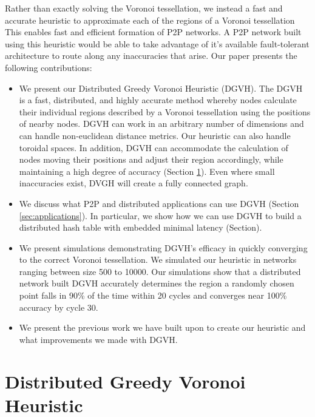 \documentclass[11pt, conference, letterpaper]{IEEEtran}
\begin{document}
Rather than exactly solving the Voronoi tessellation, we instead a fast and accurate heuristic to approximate each of the regions of a Voronoi tessellation
This enables fast and efficient formation of P2P networks.
A P2P network built using this heuristic would be able to take advantage of it's available fault-tolerant architecture to route along any inaccuracies that arise.
Our paper presents the following contributions:
\begin{itemize}
	\item We present our Distributed Greedy Voronoi Heuristic (DGVH). 
	The DGVH is a fast, distributed, and highly accurate method whereby nodes calculate their individual regions described by a Voronoi tessellation using the positions of nearby nodes.
	DGVH can work in an arbitrary number of dimensions and can handle non-euclidean distance metrics.
    Our heuristic can also handle toroidal spaces.
	In addition, DGVH can accommodate the calculation of nodes moving their positions and adjust their region accordingly, while maintaining a high degree of accuracy (Section \ref{sec:dgvh}).
    Even where small inaccuracies exist, DVGH will create a fully connected graph.
	\item We discuss what P2P and distributed applications can use DGVH (Section \ref{sec:applications}).
	In particular, we show how we can use DGVH to build a distributed hash table with embedded minimal latency (Section).
	\item We present simulations demonstrating DGVH's efficacy in quickly converging to the correct Voronoi tessellation.
    We simulated our heuristic in networks ranging between size 500 to 10000.
	Our simulations show that a distributed network built DGVH accurately determines the region a randomly chosen point falls in 90\% of the time within 20 cycles and converges near 100\% accuracy by cycle 30.
	\item We present the previous work we have built upon to create our heuristic and what improvements we made with DGVH.
	
\end{itemize}


\section{Distributed Greedy Voronoi Heuristic}
\label{sec:dgvh}
\end{document}
